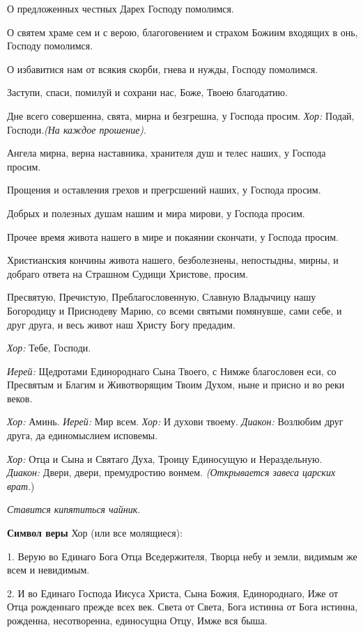   О предложенных честных Дарех Господу помолимся. 

  О святем храме сем и с верою, благоговением и страхом Божиим входящих в онь, Господу помолимся. 

  О избавитися нам от всякия скорби, гнева и нужды, Господу помолимся. 

  Заступи, спаси, помилуй и сохрани нас, Боже, Твоею благодатию. 

  Дне всего совершенна, свята, мирна и безгрешна, у Господа просим. 
{\itshape 
  Хор:} Подай, Господи.{\itshape  (На каждое прошение)}. 

  Ангела мирна, верна наставника, хранителя душ и телес наших, у Господа просим. 

  Прощения и оставления грехов и прегрсшений наших, у Господа просим. 

  Добрых и полезных душам нашим и мира мирови, у Господа просим. 

  Прочее время живота нашего в мире и покаянии скончати, у Господа просим. 

  Христианския кончины живота нашего, безболезнены, непостыдны, мирны, и добраго ответа на Страшном Судищи Христове, просим. 

  Пресвятую, Пречистую, Преблагословенную, Славную Владычицу нашу Богородицу и Приснодеву Марию, со всеми святыми помянувше, сами себе, и друг друга, и весь живот наш Христу Богу предадим.

{\itshape Хор:} Тебе, Господи.

{\itshape Иерей:} Щедротами Единороднаго Сына Твоего, с Нимже благословен еси, со Пресвятым и Благим и Животворящим Твоим Духом, ныне и присно и во реки веков.

{\itshape Хор:} Аминь. {\itshape  Иерей:} Мир всем. {\itshape  Хор:} И духови твоему. {\itshape  Диакон:} Возлюбим друг друга, да единомыслием исповемы.

{\itshape Хор:} Отца и Сына и Святаго Духа, Троицу Единосущую и Нераздельную. {\itshape  Диакон:} Двери, двери, премудростию вонмем. {\itshape  (Открывается завеса царских врат}.)
 

{\itshape  Ставится кипятиться чайник}. 

 {\bfseries  Символ веры }
  Хор (или все молящиеся):

  1. Верую во Единаго Бога Отца Вседержителя, Творца небу и земли, видимым же всем и невидимым. 

  2. И во Единаго Господа Иисуса Христа, Сына Божия, Единороднаго, Иже от Отца рожденнаго прежде всех век. Света от Света, Бога истинна от Бога истинна, рожденна, несотворенна, единосущна Отцу, Имже вся быша.

